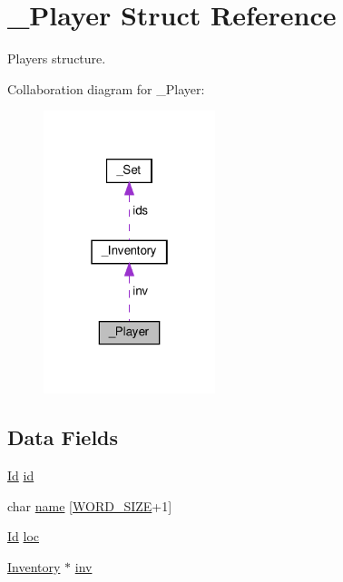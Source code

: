 \hypertarget{struct__Player}{}\section{\+\_\+\+Player Struct Reference}
\label{struct__Player}


Player\textquotesingle{}s structure.  




Collaboration diagram for \+\_\+\+Player\+:\nopagebreak
\begin{figure}[H]
\begin{center}
\leavevmode
\includegraphics[width=142pt]{struct__Player__coll__graph}
\end{center}
\end{figure}
\subsection*{Data Fields}
\begin{DoxyCompactItemize}
\item 
\hyperlink{types_8h_a845e604fb28f7e3d97549da3448149d3}{Id} \hyperlink{struct__Player_a60d635cd063816a9c1bd873f4868bb90}{id}
\item 
char \hyperlink{struct__Player_ac89715f913cc607b75eb7236765c41f5}{name} \mbox{[}\hyperlink{types_8h_a92ed8507d1cd2331ad09275c5c4c1c89}{W\+O\+R\+D\+\_\+\+S\+I\+ZE}+1\mbox{]}
\item 
\hyperlink{types_8h_a845e604fb28f7e3d97549da3448149d3}{Id} \hyperlink{struct__Player_a40f39335ccf0d2de882b7588f1917e58}{loc}
\item 
\hyperlink{struct__Inventory}{Inventory} $\ast$ \hyperlink{struct__Player_aaaeeb03326c37ce62c333c2b94fde23c}{inv}
\end{DoxyCompactItemize}


